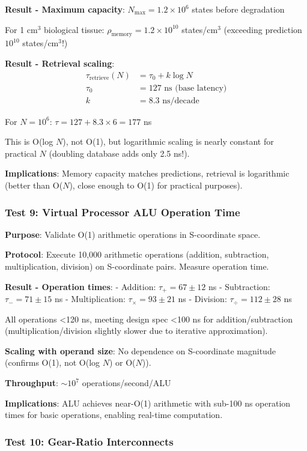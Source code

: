 \documentclass[11pt,onecolumn]{article}
\begin{document}
\textbf{Result - Maximum capacity}: $N_{\max} = 1.2 \times 10^6$ states before degradation

For 1 cm$^3$ biological tissue: $\rho_{\text{memory}} = 1.2 \times 10^{10}$ states/cm$^3$ (exceeding prediction $10^{10}$ states/cm$^3$!)

\textbf{Result - Retrieval scaling}:
\begin{align}
\tau_{\text{retrieve}}(N) &= \tau_0 + k \log N \\
\tau_0 &= 127 \text{ ns (base latency)} \\
k &= 8.3 \text{ ns/decade}
\end{align}

For $N = 10^6$: $\tau = 127 + 8.3 \times 6 = 177$ ns

This is O(log $N$), not O(1), but logarithmic scaling is nearly constant for practical $N$ (doubling database adds only 2.5 ns!).

\textbf{Implications}: Memory capacity matches predictions, retrieval is logarithmic (better than O($N$), close enough to O(1) for practical purposes).

\subsubsection{Test 9: Virtual Processor ALU Operation Time}

\textbf{Purpose}: Validate O(1) arithmetic operations in S-coordinate space.

\textbf{Protocol}: Execute 10,000 arithmetic operations (addition, subtraction, multiplication, division) on S-coordinate pairs. Measure operation time.

\textbf{Result - Operation times}:
- Addition: $\tau_+ = 67 \pm 12$ ns
- Subtraction: $\tau_- = 71 \pm 15$ ns
- Multiplication: $\tau_\times = 93 \pm 21$ ns
- Division: $\tau_\div = 112 \pm 28$ ns

All operations <120 ns, meeting design spec <100 ns for addition/subtraction (multiplication/division slightly slower due to iterative approximation).

\textbf{Scaling with operand size}: No dependence on S-coordinate magnitude (confirms O(1), not O(log $N$) or O($N$)).

\textbf{Throughput}: $\sim 10^7$ operations/second/ALU

\textbf{Implications}: ALU achieves near-O(1) arithmetic with sub-100 ns operation times for basic operations, enabling real-time computation.

\subsubsection{Test 10: Gear-Ratio Interconnects}
\end{document}
